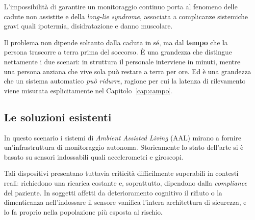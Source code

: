 L'impossibilità di garantire un monitoraggio continuo porta al fenomeno delle cadute non assistite e della \emph{long-lie syndrome}, associata a complicanze sistemiche gravi quali ipotermia, disidratazione e danno muscolare.

Il problema non dipende soltanto dalla caduta in sé, ma dal \textbf{tempo} che la persona trascorre a terra prima del soccorso. È una grandezza che distingue nettamente i due scenari: in struttura il personale interviene in minuti, mentre una persona anziana che vive sola può restare a terra per ore. Ed è una grandezza che un sistema automatico \emph{può ridurre}, ragione per cui la latenza di rilevamento viene misurata esplicitamente nel Capitolo~\ref{cap:campo}.

\subsection*{Le soluzioni esistenti}

In questo scenario i sistemi di \emph{Ambient Assisted Living} (AAL) mirano a fornire un'infrastruttura di monitoraggio autonoma. Storicamente lo stato dell'arte si è basato su sensori indossabili quali accelerometri e giroscopi.

Tali dispositivi presentano tuttavia criticità difficilmente superabili in contesti reali: richiedono una ricarica costante e, soprattutto, dipendono dalla \emph{compliance} del paziente. In soggetti affetti da deterioramento cognitivo il rifiuto o la dimenticanza nell'indossare il sensore vanifica l'intera architettura di sicurezza, e lo fa proprio nella popolazione più esposta al rischio.
